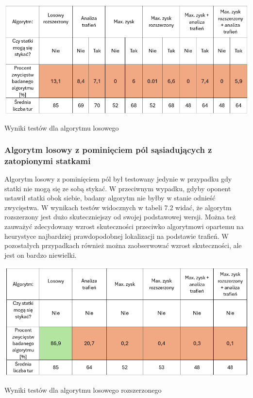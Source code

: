 \begin{table}[!h]
    \centering
    \includegraphics[width=1\linewidth]{img/table-random.png}
    \caption{Wyniki testów dla algorytmu losowego}
\end{table}

\subsubsection{Algorytm losowy z pominięciem pól sąsiadujących z zatopionymi statkami}

Algorytm losowy z pominięciem pól był testowany jedynie w przypadku gdy statki nie mogą się ze sobą stykać. W przeciwnym wypadku, gdyby oponent ustawił statki obok siebie, badany algorytm nie byłby w stanie odnieść zwycięstwa. W wynikach testów widocznych w tabeli 7.2 widać, że algorytm rozszerzony jest dużo skuteczniejszy od swojej podstawowej wersji. Można też zauważyć zdecydowany wzrost skuteczności przeciwko algorytmowi opartemu na heurystyce najbardziej prawdopodobnej lokalizacji na podstawie trafień. W pozostałych przypadkach również można zaobserwować wzrost skuteczności, ale jest on bardzo niewielki.

\begin{table}[!h]
    \centering
    \includegraphics[width=1\linewidth]{img/table-random-plus.png}
    \caption{Wyniki testów dla algorytmu losowego rozszerzonego}
\end{table}


